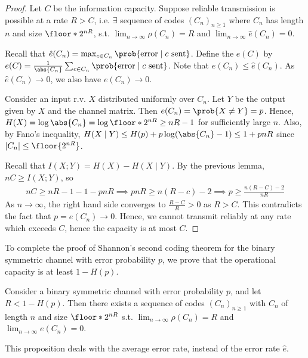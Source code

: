 \begin{proof}
    Let $C$ be the information capacity.
    Suppose reliable transmission is possible at a rate $R > C$, i.e. $\exists$ sequence of codes $(C_n)_{n \geq 1}$ where $C_n$ has length $n$ and size $\floor*{2^{nR}}$, s.t. $\lim_{n \to \infty} \rho(C_n) = R$ and $\lim_{n \to \infty} \hat e(C_n) = 0$.

    Recall that $\hat e(C_n) = \max_{c \in C_n} \prob{\text{error} \mid c \text{ sent}}$.
    Define the  $e(C)$ by $e(C) = \frac{1}{\abs{C_n}} \sum_{c \in C_n} \prob{\text{error} \mid c \text{ sent}}$.
    Note that $e(C_n) \leq \hat e(C_n)$.
    As $\hat e(C_n) \to 0$, we also have $e(C_n) \to 0$.

    Consider an input r.v. $X$ distributed uniformly over $C_n$.
    Let $Y$ be the output given by $X$ and the channel matrix.
    Then $e(C_n) = \prob{X \neq Y} = p$.
    Hence, $H(X) = \log \abs{C_n} = \log \floor*{2^{nR}} \geq nR - 1$ for sufficiently large $n$.
    Also, by Fano's inequality, $H(X \mid Y) \leq H(p) + p \log(\abs{C_n} - 1) \leq 1 + pnR$ since $|C_n| \leq \floor{2^{nR}}$.

    Recall that $I(X;Y) = H(X) - H(X \mid Y)$.
    By the previous lemma, $nC \geq I(X;Y)$, so
    \begin{align*}
        nC \geq nR - 1 - 1 - pnR \implies pnR \geq n(R - c) - 2 \implies p \geq \frac{n(R - C) - 2}{nR}
    \end{align*}
    As $n \to \infty$, the right hand side converges to $\frac{R - C}{R} > 0$ as $R > C$.
    This contradicts the fact that $p = e(C_n) \to 0$.
    Hence, we cannot transmit reliably at any rate which exceeds $C$, hence the capacity is at most $C$.
\end{proof}

To complete the proof of Shannon's second coding theorem for the binary symmetric channel with error probability $p$, we prove that the operational capacity is at least $1 - H(p)$.

\begin{proposition}
    Consider a binary symmetric channel with error probability $p$, and let $R < 1 - H(p)$.
    Then there exists a sequence of codes $(C_n)_{n \geq 1}$ with $C_n$ of length $n$ and size $\floor*{2^{nR}}$ s.t. $\lim_{n \to \infty} \rho(C_n) = R$ and $\lim_{n \to \infty} e(C_n) = 0$.
\end{proposition}

\begin{remark}
    This proposition deals with the average error rate, instead of the error rate $\hat e$.
\end{remark}

